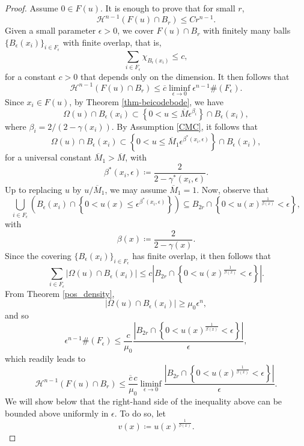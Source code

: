 \documentclass[reqno,11pt]{amsart}
\newcommand{\1}{\mathds{1}}
\numberwithin{equation}{section}
\begin{document}
\begin{proof}
Assume $0 \in F(u)$. It is enough to prove that for small $r$,
$$
\mathcal{H}^{n-1}(F(u) \cap B_{r}) \leq Cr^{n-1}.
$$
Given a small parameter $\epsilon>0$, we cover $F(u) \cap B_r$ with finitely many balls $\{B_\epsilon(x_i) \}_{i \in F_\epsilon}$ with finite overlap, that is,
$$
    \sum_{i \in F_\epsilon} \chi_{B_\epsilon(x_i)} \leq c,
$$
for a constant $c>0$ that depends only on the dimension. It then follows that
\begin{equation}\nonumber
    \mathcal{H}^{n-1}(F(u)\cap B_r) \leq \overline{c} \liminf_{\epsilon \rightarrow 0} \epsilon^{n-1} \#(F_\epsilon).
\end{equation}
Since $x_i \in F(u)$, by Theorem \ref{thm-beicodebode}, we have
$$
    \Omega(u) \cap B_\epsilon(x_i) \subset \left\{0 < u \leq \overline{M}\epsilon^{\beta_i} \right\} \cap B_\epsilon(x_i),
$$
where $\beta_i = 2/(2-\gamma(x_i))$. By Assumption \eqref{CMC}, it follows that
$$
    \Omega(u) \cap B_\epsilon(x_i) \subset \left\{0 < u \leq \overline{M}_1\epsilon^{\beta^\ast(x_i,\epsilon)} \right\} \cap B_\epsilon(x_i),
$$
for a universal constant $\overline{M}_1 > \overline{M}$, with
$$
	\beta^\ast(x_i,\epsilon) \coloneqq \frac{2}{2-\gamma^\ast(x_i,\epsilon)}.
$$
Up to replacing $u$ by $u/\overline{M}_1$, we may assume $\overline{M}_1 = 1$. Now, observe that
$$
    \bigcup_{i 
    \in F_\epsilon} \left(B_\epsilon(x_i) \cap \left\{ 0 < u(x) \leq \epsilon^{\beta^\ast(x_i,\epsilon)} \right\} \right) \subseteq B_{2r} \cap \left\{0 < u(x)^{\frac{1}{\beta(x)}} < \epsilon \right\},
$$
with
$$
	\beta(x) \coloneqq \frac{2}{2-\gamma(x)}.
$$
Since the covering $\{B_\epsilon(x_i) \}_{i \in F_\epsilon}$ has finite overlap, it then follows that
$$
    \sum_{i \in F_\epsilon} \left| \Omega(u) \cap B_\epsilon(x_i) \right| \leq c \left| B_{2r} \cap \left\{0 < u(x)^{\frac{1}{\beta(x)}} < \epsilon \right\}\right|.
$$
From Theorem \ref{pos_density},
$$
    |\Omega(u) \cap B_\epsilon(x_i)| \geq \mu_0 \epsilon^n,
$$
and so
$$
     \epsilon^{n-1} \#(F_\epsilon) \leq \frac{c}{\mu_0} \frac{\left|B_{2r} \cap \left\{0 < u(x)^{\frac{1}{\beta(x)}} < \epsilon \right\}\right|}{\epsilon},
$$
which readily leads to
$$
    \mathcal{H}^{n-1}(F(u) \cap B_r) \leq \frac{\overline{c}\, c}{\mu_0} \liminf_{\epsilon \rightarrow 0} \frac{\left|B_{2r} \cap \left\{0 < u(x)^{\frac{1}{\beta(x)}} < \epsilon \right\}\right|}{\epsilon}.
$$
We will show below that the right-hand side of the inequality above can be bounded above uniformly in $\epsilon$. To do so, let 
$$
    v(x) \coloneqq u(x)^{\frac{1}{\beta(x)}}.
$$
\end{proof}
\end{document}
